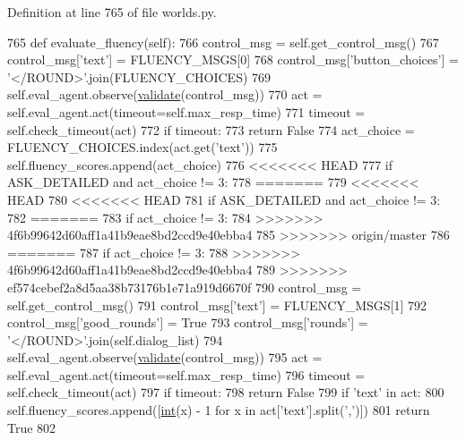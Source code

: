 Definition at line 765 of file worlds.\+py.


\begin{DoxyCode}
765     \textcolor{keyword}{def }evaluate\_fluency(self):
766         control\_msg = self.get\_control\_msg()
767         control\_msg[\textcolor{stringliteral}{'text'}] = FLUENCY\_MSGS[0]
768         control\_msg[\textcolor{stringliteral}{'button\_choices'}] = \textcolor{stringliteral}{'</ROUND>'}.join(FLUENCY\_CHOICES)
769         self.eval\_agent.observe(\hyperlink{namespaceparlai_1_1core_1_1worlds_afc3fad603b7bce41dbdc9cdc04a9c794}{validate}(control\_msg))
770         act = self.eval\_agent.act(timeout=self.max\_resp\_time)
771         timeout = self.check\_timeout(act)
772         \textcolor{keywordflow}{if} timeout:
773             \textcolor{keywordflow}{return} \textcolor{keyword}{False}
774         act\_choice = FLUENCY\_CHOICES.index(act.get(\textcolor{stringliteral}{'text'}))
775         self.fluency\_scores.append(act\_choice)
776 <<<<<<< HEAD
777         \textcolor{keywordflow}{if} ASK\_DETAILED \textcolor{keywordflow}{and} act\_choice != 3:
778 =======
779 <<<<<<< HEAD
780 <<<<<<< HEAD
781         \textcolor{keywordflow}{if} ASK\_DETAILED \textcolor{keywordflow}{and} act\_choice != 3:
782 =======
783         \textcolor{keywordflow}{if} act\_choice != 3:
784 >>>>>>> 4f6b99642d60aff1a41b9eae8bd2ccd9e40ebba4
785 >>>>>>> origin/master
786 =======
787         \textcolor{keywordflow}{if} act\_choice != 3:
788 >>>>>>> 4f6b99642d60aff1a41b9eae8bd2ccd9e40ebba4
789 >>>>>>> ef574cebef2a8d5aa38b73176b1e71a919d6670f
790             control\_msg = self.get\_control\_msg()
791             control\_msg[\textcolor{stringliteral}{'text'}] = FLUENCY\_MSGS[1]
792             control\_msg[\textcolor{stringliteral}{'good\_rounds'}] = \textcolor{keyword}{True}
793             control\_msg[\textcolor{stringliteral}{'rounds'}] = \textcolor{stringliteral}{'</ROUND>'}.join(self.dialog\_list)
794             self.eval\_agent.observe(\hyperlink{namespaceparlai_1_1core_1_1worlds_afc3fad603b7bce41dbdc9cdc04a9c794}{validate}(control\_msg))
795             act = self.eval\_agent.act(timeout=self.max\_resp\_time)
796             timeout = self.check\_timeout(act)
797             \textcolor{keywordflow}{if} timeout:
798                 \textcolor{keywordflow}{return} \textcolor{keyword}{False}
799             \textcolor{keywordflow}{if} \textcolor{stringliteral}{'text'} \textcolor{keywordflow}{in} act:
800                 self.fluency\_scores.append([\hyperlink{namespacelanguage__model_1_1eval__ppl_a7d12ee00479673c5c8d1f6d01faa272a}{int}(x) - 1 \textcolor{keywordflow}{for} x \textcolor{keywordflow}{in} act[\textcolor{stringliteral}{'text'}].split(\textcolor{stringliteral}{','})])
801         \textcolor{keywordflow}{return} \textcolor{keyword}{True}
802 
\end{DoxyCode}
